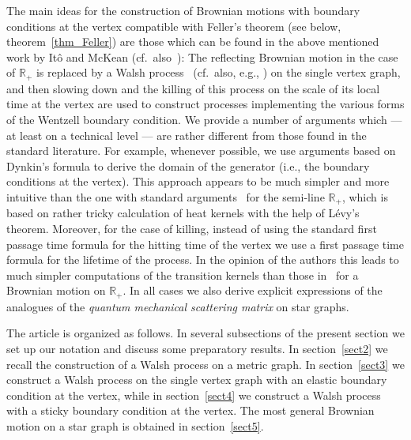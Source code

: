 \documentclass[11pt,a4paper]{amsart}
\newcommand{\cG}{\mathcal{G}}
\newcommand{\1}{1}
\newcommand{\R}{\mathbb{R}}
\theoremstyle{remark}
\newcommand{\op}{\ensuremath^\circ}
\newcommand{\cGo}{\ensuremath\cG\op}
\newcommand{\sn}{\ensuremath\{1,2,\dotsc,n\}}
\numberwithin{equation}{section}
\begin{document}

The main ideas for the construction of Brownian motions with boundary
conditions at the vertex compatible with Feller's theorem (see below,
theorem~\ref{thm_Feller}) are those which can be found in the above mentioned work
by It\^o and McKean (cf.\ also~\cite[Chapter~6]{Kn81}): The reflecting
Brownian motion in the case of $\R_+$ is replaced by a Walsh process~{\cite{Wa78}}
(cf.\ also, e.g., \cite{BaPi89}) on the single vertex graph, and then
slowing down and the killing of this process on the scale of its local time at the vertex
are used to construct processes implementing the various forms of the Wentzell boundary
condition. We provide a number of arguments which --- at least on
a technical level --- are rather different from those found in the standard
literature. For example, whenever possible, we use arguments based on Dynkin's formula
to derive the domain of the generator (i.e., the boundary conditions at the vertex). This
approach appears to be much simpler and more intuitive than the one with standard
arguments~\cite{ItMc63, ItMc74, Kn81} for the semi-line $\R_+$, which is based on
rather tricky calculation of heat kernels with the help of L\'evy's theorem.
Moreover, for the case of killing, instead of using the standard first passage time
formula for the hitting time of the vertex we use a first passage time formula for
the lifetime of the process. In the opinion of the authors this leads to much
simpler computations of the transition kernels than those in~\cite{ItMc63, ItMc74,
Kn81} for a Brownian motion on $\R_+$. In all cases we also derive explicit expressions
of the analogues of the \emph{quantum mechanical scattering matrix} on star
graphs.

The article is organized as follows. In several subsections of the present section
we set up our notation and discuss some preparatory results. In section~\ref{sect2}
we recall the construction of a Walsh process on a metric graph. In
section~\ref{sect3} we construct a Walsh process on the single vertex graph with an
elastic boundary condition at the vertex, while in section~\ref{sect4} we construct
a Walsh process with a sticky boundary condition at the vertex. The most general
Brownian motion on a star graph is obtained in section~\ref{sect5}.
\end{document}
